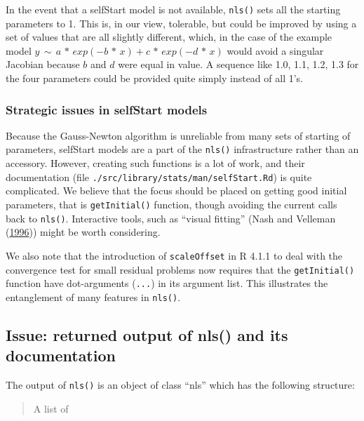 \documentclass[
]{article}
\begin{document}
In the event that a selfStart model is not available, \texttt{nls()}
sets all the starting parameters to 1. This is, in our view, tolerable,
but could be improved by using a set of values that are all slightly
different, which, in the case of the example model
\(y \,\sim\, a \,*\, exp(-b \,*\, x) + c\,*\,exp(-d \,*\, x)\) would
avoid a singular Jacobian because \(b\) and \(d\) were equal in value. A
sequence like 1.0, 1.1, 1.2, 1.3 for the four parameters could be
provided quite simply instead of all 1's.

\hypertarget{strategic-issues-in-selfstart-models}{%
\subsubsection{Strategic issues in selfStart
models}\label{strategic-issues-in-selfstart-models}}

Because the Gauss-Newton algorithm is unreliable from many sets of
starting of parameters, selfStart models are a part of the
\texttt{nls()} infrastructure rather than an accessory. However,
creating such functions is a lot of work, and their documentation (file
\texttt{./src/library/stats/man/selfStart.Rd}) is quite complicated. We
believe that the focus should be placed on getting good initial
parameters, that is \texttt{getInitial()} function, though avoiding the
current calls back to \texttt{nls()}. Interactive tools, such as
``visual fitting'' (Nash and Velleman
(\protect\hyperlink{ref-nash1996nonlinear}{1996})) might be worth
considering.

We also note that the introduction of \texttt{scaleOffset} in R 4.1.1 to
deal with the convergence test for small residual problems now requires
that the \texttt{getInitial()} function have dot-arguments
(\texttt{...}) in its argument list. This illustrates the entanglement
of many features in \texttt{nls()}.

\hypertarget{issue-returned-output-of-nls-and-its-documentation}{%
\subsection{Issue: returned output of nls() and its
documentation}\label{issue-returned-output-of-nls-and-its-documentation}}

The output of \texttt{nls()} is an object of class ``nls'' which has the
following structure:

\begin{quote}
A list of
\end{quote}
\end{document}
